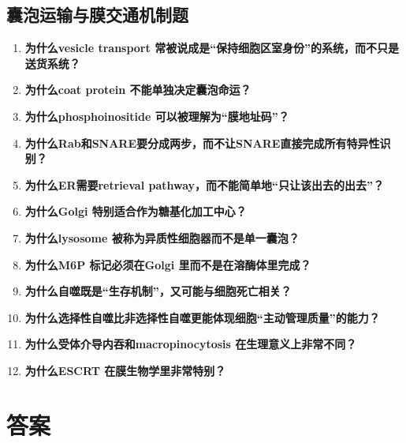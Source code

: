 \documentclass[12pt,fontset=none]{ctexart}
\begin{document}
\subsection*{囊泡运输与膜交通机制题}
\begin{enumerate}
\item \textbf{为什么vesicle transport 常被说成是“保持细胞区室身份”的系统，而不只是送货系统？}

\item \textbf{为什么coat protein 不能单独决定囊泡命运？}

\item \textbf{为什么phosphoinositide 可以被理解为“膜地址码”？}

\item \textbf{为什么Rab和SNARE要分成两步，而不让SNARE直接完成所有特异性识别？}

\item \textbf{为什么ER需要retrieval pathway，而不能简单地“只让该出去的出去”？}

\item \textbf{为什么Golgi 特别适合作为糖基化加工中心？}

\item \textbf{为什么lysosome 被称为异质性细胞器而不是单一囊泡？}

\item \textbf{为什么M6P 标记必须在Golgi 里而不是在溶酶体里完成？}

\item \textbf{为什么自噬既是“生存机制”，又可能与细胞死亡相关？}

\item \textbf{为什么选择性自噬比非选择性自噬更能体现细胞“主动管理质量”的能力？}

\item \textbf{为什么受体介导内吞和macropinocytosis 在生理意义上非常不同？}

\item \textbf{为什么ESCRT 在膜生物学里非常特别？}

\end{enumerate}



\newpage
{}
\section*{答案}
\end{document}
